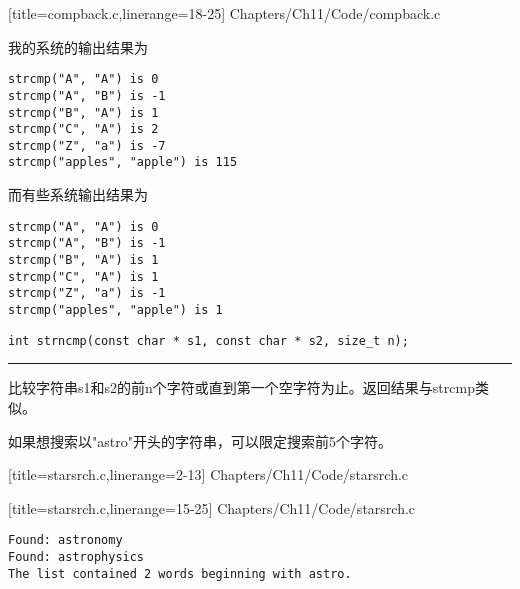\begin{frame}[fragile]

[title=compback.c,linerange={18-25}]
{Chapters/Ch11/Code/compback.c}
\end{frame}

\begin{frame}[fragile]
我的系统的输出结果为
\begin{lstlisting}[basicstyle=\ttfamily]
strcmp("A", "A") is 0
strcmp("A", "B") is -1
strcmp("B", "A") is 1
strcmp("C", "A") is 2
strcmp("Z", "a") is -7
strcmp("apples", "apple") is 115
\end{lstlisting}
而有些系统输出结果为
\begin{lstlisting}[basicstyle=\ttfamily]
strcmp("A", "A") is 0
strcmp("A", "B") is -1
strcmp("B", "A") is 1
strcmp("C", "A") is 1
strcmp("Z", "a") is -1
strcmp("apples", "apple") is 1
\end{lstlisting}
\end{frame}

\begin{frame}[fragile] 
\begin{lstlisting}[title=strncmp函数原型, basicstyle=\ttfamily]
int strncmp(const char * s1, const char * s2, size_t n);
\end{lstlisting}
\rule{\textwidth}{0.3mm} \vspace{0.3mm}

比较字符串s1和s2的前n个字符或直到第一个空字符为止。返回结果与strcmp类似。
\end{frame}

\begin{frame}[fragile]
如果想搜索以"astro"开头的字符串，可以限定搜索前5个字符。

[title=starsrch.c,linerange={2-13}]
{Chapters/Ch11/Code/starsrch.c}

\end{frame}

\begin{frame}[fragile]

[title=starsrch.c,linerange={15-25}]
{Chapters/Ch11/Code/starsrch.c}
\end{frame}

\begin{frame}[fragile]
\begin{lstlisting}[basicstyle=\ttfamily]
Found: astronomy
Found: astrophysics
The list contained 2 words beginning with astro.
\end{lstlisting}


\end{frame}

